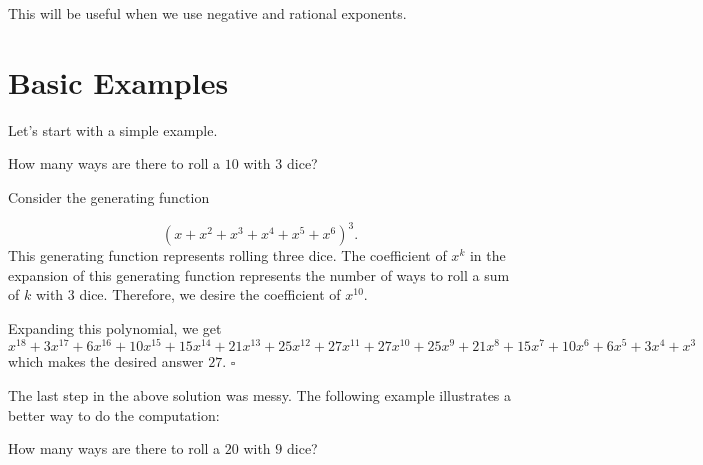 \documentclass{article}
\begin{document}
This will be useful when we use negative and rational exponents.

\section{Basic Examples}
Let's start with a simple example.
\begin{exam}
How many ways are there to roll a $10$ with $3$ dice?
\end{exam}
\begin{sol}
Consider the generating function

\[(x+x^2+x^3+x^4+x^5+x^6)^{3}.\]
This generating function represents rolling three dice. The coefficient of $x^k$ in the expansion of this generating function represents the number of ways to roll a sum of $k$ with $3$ dice. Therefore, we desire the coefficient of $x^{10}$.

Expanding this polynomial, we get
\[x^{18} + 3 x^{17} + 6 x^{16} + 10 x^{15} + 15 x^{14} + 21 x^{13} + 25 x^{12} + 27 x^{11} + 27 x^{10} + 25 x^9 + 21 x^8 + 15 x^7 + 10 x^6 + 6 x^5 + 3 x^4 + x^3\]
which makes the desired answer $27$. $\square$
\end{sol}
\bigskip

The last step in the above solution was messy. The following example illustrates a better way to do the computation:

\begin{exam}
How many ways are there to roll a $20$ with $9$ dice?
\end{exam}
\end{document}

